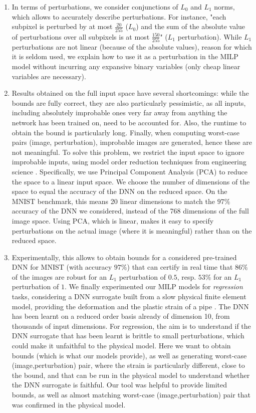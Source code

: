 \begin{enumerate}
   \item  In terms of perturbations, we consider conjunctions of $L_0$ and $L_1$ norms, which allows to accurately describe perturbations. For instance, "each subpixel is perturbed by at most $\frac{20}{255}$ ($L_0$) and the sum of the absolute value of perturbations over all subpixels is at most $\frac{150}{255}$" ($L_1$ perturbation). While $L_1$ perturbations are not linear (because of the absolute values), reason for which it is seldom used, we explain how to use it as a perturbation in the MILP model without incurring any expansive binary variables (only cheap linear variables are necessary).

	\item Results obtained on the full input space have several shortcomings: while the bounds are fully correct, they are also particularly pessimistic, as all inputs, including absolutely improbable ones very far away from anything the network has been trained on, need to be accounted for. Also, the runtime to obtain the bound is particularly long. Finally, when computing worst-case 
	pairs (image, perturbation), improbable images are generated, hence these  are not meaningful. To solve this problem, we restrict the input space to ignore improbable inputs, using model order reduction techniques from engineering science \cite{aiware}. Specifically, we use Principal Component Analysis (PCA) to reduce the space to a linear input space. We choose the number of dimensions of the space to equal the accuracy of the DNN on the reduced space. 
	On the MNIST benchmark, this means 20 linear dimensions to match the $97\%$ accuracy of the DNN we considered, instead of the 768 dimensions of the full image space. Using PCA, which is linear, makes it easy to specify perturbations on the actual image (where it is meaningful) rather than on the reduced space.

\item Experimentally, this allows to obtain bounds for a considered pre-trained DNN for MNIST (with accuracy $97\%$) that can certify in real time that $86\%$ of the images are robust for an $L_1$ perturbation of $0.5$, resp. $53\%$ for an $L_1$ perturbation of $1$. We finally experimented our MILP models for {\em regression} tasks, considering a DNN surrogate built from a slow physical finite element model, providing the deformation and the plastic strain of a pipe \cite{aiware}. The DNN has been learnt on a reduced order basis already of dimension 10, from thousands of input dimensions. For regression, the aim is to understand if the DNN surrogate that has been learnt is brittle to small perturbations, which could make it unfaithful to the physical model. Here we want to obtain bounds (which is what our models provide), as well as generating worst-case (image,perturbation) pair, where the strain is particularly different, close to the bound, and that can be run in the physical model to understand whether the DNN surrogate is faithful. Our tool was helpful to provide limited bounds, as well as almost matching worst-case (image,perturbation) pair that was confirmed in the physical model.


\end{enumerate}
